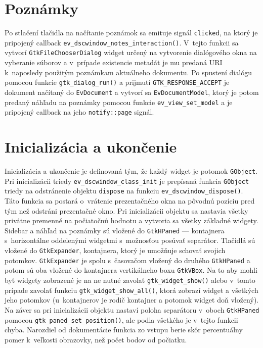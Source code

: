 \documentclass[12pt,oneside,final]{fithesis2}
\begin{document}
\section{Poznámky}
Po stlačení tlačidla na načítanie poznámok sa emituje signál \texttt{clicked}, na ktorý je pripojený callback \texttt{ev\_\-dscwindow\_\-notes\_\-interaction()}. V~tejto funkcii sa vytvorí \texttt{GtkFileChooserDialog} widget určený na vytvorenie dialógového okna na vyberanie súborov a v~prípade existencie metadát je mu predaná URI k~naposledy použitým poznámkam aktuálneho dokumentu. Po spustení dialógu pomocou funkcie \texttt{gtk\_\-dialog\_\-run()} a prijmutí \texttt{GTK\_\-RESPONSE\_\-ACCEPT} je dokument načítaný do \texttt{EvDocument} a vytvorí sa \texttt{EvDocumentModel}, ktorý je potom predaný náhľadu na poznámky pomocou funkcie \texttt{ev\_\-view\_\-set\_\-model} a je pripojený callback na jeho \texttt{notify::page} signál.
\section{Inicializácia a ukončenie}
Inicializácia a ukončenie je definovaná tým, že každý widget je potomok \texttt{GObject}. Pri inicializácii triedy \texttt{ev\_\-dscwindow\_\-class\_\-init} je prepísaná funkcia \texttt{GObject} triedy na odstránenie objektu \texttt{dispose} na funkciu \texttt{ev\_\-dscwindow\_\-dispose()}. Táto funkcia sa postará o~vrátenie prezentačného okna na pôvodnú pozíciu pred tým než odstráni prezentačné okno. Pri inicializácii objektu sa nastavia všetky privátne premenné na počiatočnú hodnotu a vytvoria sa všetky základné widgety. Sidebar a náhľad na poznámky sú vložené do \texttt{GtkHPaned} --- kontajnera s~horizontálne oddelenými widgetmi s~možnosťou posúvať separátor. Tlačidlá sú vložené do \texttt{GtkExpander}, kontajnera, ktorý je umožňuje schovať svojich potomkov. \texttt{GtkExpander} je spolu s~časovačom vložený do druhého \texttt{GtkHPaned} a potom sú oba vložené do kontajnera vertikálneho boxu \texttt{GtkVBox}. Na to aby mohli byť widgety zobrazené je na ne nutné zavolať \texttt{gtk\_\-widget\_\-show()} alebo v~tomto prípade zavolať funkciu \texttt{gtk\_\-widget\_\-show\_\-all()}, ktorá zobrazí widget a všetkých jeho potomkov (u~kontajnerov je rodič kontajner a potomok widget doň vložený). Na záver sa pri inicializácii objektu nastaví poloha separátoru v~oboch \texttt{GtkHPaned} pomocou \texttt{gtk\_\-paned\_\-set\_\-position()}, ale podla všetkého je v~tejto funkcii chyba. Narozdiel od dokumentácie funkcia zo vstupu berie skôr percentuálny pomer k~veľkosti obrazovky, než počet bodov od počiatku.
\end{document}
